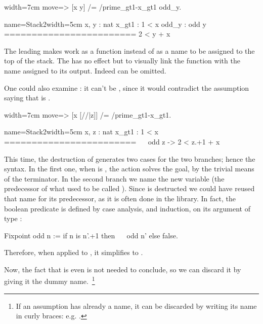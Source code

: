 \begin{coq-left}{}{width=7cm}
move=> [x y] /= /prime_gt1-x_gt1 odd_y.
$~$
$~$
$~$
$~$
\end{coq-left}
\begin{coqout-right}{name=Stack2}{width=5cm}
 x, y : nat
 x_gt1 : 1 < x
 odd_y : odd y
========================
 2 < y + x
\end{coqout-right}

The leading \C{/} makes  work as a function instead of
as a name to be assigned to the top of the stack.  The \C{-} has no effect but
to visually link the function with the name  assigned to its output.
Indeed \C{-} can be omitted.

One could also examine : it can't be , since it would contradict
the assumption saying that  is .

\begin{coq-left}{}{width=7cm}
move=> [x [//|z]] /= /prime_gt1-x_gt1.
$~$
$~$
$~$
$~$
\end{coq-left}
\begin{coqout-right}{name=Stack2}{width=5cm}
 x, z : nat
 x_gt1 : 1 < x
 ========================
 ~~ odd z -> 2 < z.+1 + x
\end{coqout-right}

This time, the destruction of  generates two cases for the two
branches; hence the \C{[ .. | .. ]} syntax.  In the first one, when
 is ,
the \C{//} action solves the goal, by the trivial means
of the  terminator.  In the second branch we name  the
new variable (the predecessor of what used to be called ).
Since  is destructed we could have reused that name for
its predecessor, as it is often done in the \mcbMC{} library.
In fact, the boolean predicate  is defined by case analysis,
and induction, on its argument of type :
\begin{coq}{}{}
Fixpoint odd n := if n is n'.+1 then ~~ odd n' else false.
\end{coq}
Therefore, when applied to , it simplifies to .

Now, the fact that  is even is not needed to conclude, so we can
discard it by giving it the \C{\_} dummy name.~\footnote{
If an assumption has already a name, it can be discarded by
writing its name in curly braces: e.g. .
}

